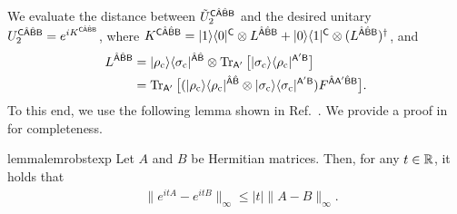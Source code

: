 We evaluate the distance between $\tilde{U}_2^{{\mathsf{C}}\hat{{\mathsf{A}}}\hat{{\mathsf{B}}}{\mathsf{B}}}$ and the desired unitary $U_2^{{\mathsf{C}}\hat{{\mathsf{A}}}\hat{{\mathsf{B}}}{\mathsf{B}}} = e^{iK^{{\mathsf{C}}\hat{{\mathsf{A}}}\hat{{\mathsf{B}}}{\mathsf{B}}}}$,
where $K^{{\mathsf{C}}\hat{{\mathsf{A}}}\hat{{\mathsf{B}}}{\mathsf{B}}} = |1\rangle\langle0|^{\mathsf{C}} \otimes L^{\hat{{\mathsf{A}}}\hat{{\mathsf{B}}}{\mathsf{B}}} + |0\rangle\langle1|^{\mathsf{C}} \otimes (L^{\hat{{\mathsf{A}}}\hat{{\mathsf{B}}}{\mathsf{B}}})^\dag$,
and
\begin{align}
    L^{\hat{{\mathsf{A}}}\hat{{\mathsf{B}}}{\mathsf{B}}} 
    &= |\rho_{\rm c}\rangle\langle\sigma_{\rm c}|^{\hat{{\mathsf{A}}}\hat{{\mathsf{B}}}} \otimes \operatorname{Tr}_{{\mathsf{A}}'}\big[|\sigma_{\rm c}\rangle\langle\rho_{\rm c}|^{{\mathsf{A}}'{\mathsf{B}}}\big] \\
    &= \operatorname{Tr}_{{\mathsf{A}}'}\big[(|\rho_{\rm c}\rangle\langle\rho_{\rm c}|^{\hat{{\mathsf{A}}}\hat{{\mathsf{B}}}} \otimes |\sigma_{\rm c}\rangle\langle\sigma_{\rm c}|^{{\mathsf{A}}'{\mathsf{B}}})F^{\hat{{\mathsf{A}}}{\mathsf{A}}'\hat{{\mathsf{B}}}{\mathsf{B}}}\big].
\end{align}
To this end, we use the following lemma shown in Ref.~\cite{chakraborty2019powerblock}. We provide a proof in  for completeness.




\begin{restatable}{lemma}{lemrobstexp}
\label{lem:state error not accumulate}
Let $A$ and $B$ be Hermitian matrices.
Then, for any $t \in \mathbb{R}$, it holds that
\begin{align}
    &\big\|e^{itA} - e^{itB}\big\|_\infty \leq |t|\|A - B\|_\infty.
\end{align}
\end{restatable}



